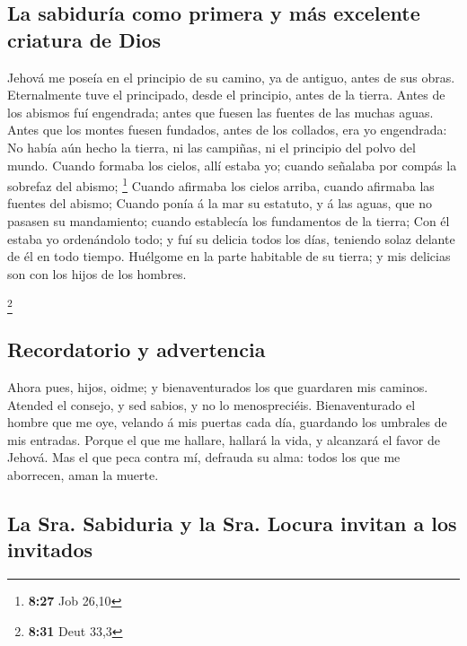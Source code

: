 \hypertarget{la-sabiduruxeda-como-primera-y-muxe1s-excelente-criatura-de-dios}{%
\subsection{La sabiduría como primera y más excelente criatura de
Dios}\label{la-sabiduruxeda-como-primera-y-muxe1s-excelente-criatura-de-dios}}

 Jehová me poseía en el principio de su camino, ya de
antiguo, antes de sus obras.  Eternalmente tuve el
principado, desde el principio, antes de la tierra. 
Antes de los abismos fuí engendrada; antes que fuesen las fuentes de las
muchas aguas.  Antes que los montes fuesen fundados,
antes de los collados, era yo engendrada:  No había aún
hecho la tierra, ni las campiñas, ni el principio del polvo del mundo.
 Cuando formaba los cielos, allí estaba yo; cuando
señalaba por compás la sobrefaz del abismo; \footnote{\textbf{8:27} Job
  26,10}  Cuando afirmaba los cielos arriba, cuando
afirmaba las fuentes del abismo;  Cuando ponía á la mar
su estatuto, y á las aguas, que no pasasen su mandamiento; cuando
establecía los fundamentos de la tierra;  Con él estaba
yo ordenándolo todo; y fuí su delicia todos los días, teniendo solaz
delante de él en todo tiempo.  Huélgome en la parte
habitable de su tierra; y mis delicias son con los hijos de los hombres.

\footnote{\textbf{8:31} Deut 33,3}

\hypertarget{recordatorio-y-advertencia}{%
\subsection{Recordatorio y
advertencia}\label{recordatorio-y-advertencia}}

 Ahora pues, hijos, oidme; y bienaventurados los que
guardaren mis caminos.  Atended el consejo, y sed sabios,
y no lo menospreciéis.  Bienaventurado el hombre que me
oye, velando á mis puertas cada día, guardando los umbrales de mis
entradas.  Porque el que me hallare, hallará la vida, y
alcanzará el favor de Jehová.  Mas el que peca contra mí,
defrauda su alma: todos los que me aborrecen, aman la muerte.

\hypertarget{la-sra.-sabiduria-y-la-sra.-locura-invitan-a-los-invitados}{%
\subsection{La Sra. Sabiduria y la Sra. Locura invitan a los
invitados}\label{la-sra.-sabiduria-y-la-sra.-locura-invitan-a-los-invitados}}

